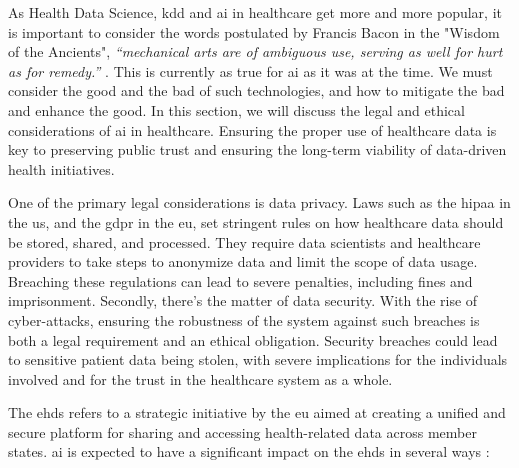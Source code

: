 
As Health Data Science, \ac{kdd} and \ac{ai} in healthcare get more and more popular, it is important to consider the words postulated by Francis Bacon in the "Wisdom of the Ancients", \textit{“mechanical arts are of ambiguous use, serving as well for hurt as for remedy.” } \cite{bacon_2011}. This is currently as true for \ac{ai} as it was at the time. We must consider the good and the bad of such technologies, and how to mitigate the bad and enhance the good. In this section, we will discuss the legal and ethical considerations of \ac{ai} in healthcare. Ensuring the proper use of healthcare data is key to preserving public trust and ensuring the long-term viability of data-driven health initiatives.

One of the primary legal considerations is data privacy. Laws such as the \ac{hipaa} in the \ac{us}, and the \ac{gdpr} in the \ac{eu}, set stringent rules on how healthcare data should be stored, shared, and processed. They require data scientists and healthcare providers to take steps to anonymize data and limit the scope of data usage. Breaching these regulations can lead to severe penalties, including fines and imprisonment.
Secondly, there's the matter of data security. With the rise of cyber-attacks, ensuring the robustness of the system against such breaches is both a legal requirement and an ethical obligation. Security breaches could lead to sensitive patient data being stolen, with severe implications for the individuals involved and for the trust in the healthcare system as a whole.


The \ac{ehds} refers to a strategic initiative by the \ac{eu} aimed at creating a unified and secure platform for sharing and accessing health-related data across member states. \ac{ai} is expected to have a significant impact on the \ac{ehds} in several ways \cite{ehds}:

